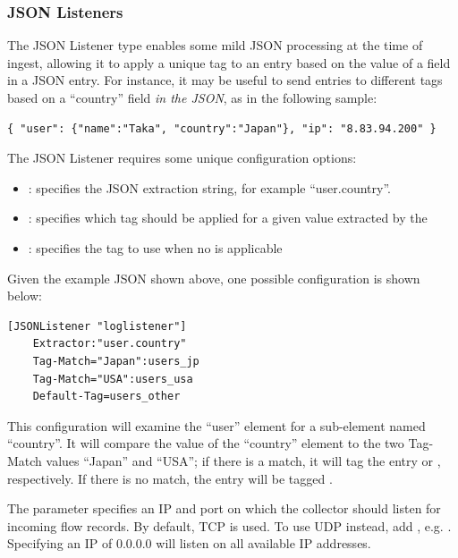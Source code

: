 \subsubsection*{JSON Listeners}

The JSON Listener type enables some mild JSON processing at the time of
ingest, allowing it to apply a unique tag to an entry based on the value
of a field in a JSON entry. For instance, it may be useful to send
entries to different tags based on a ``country'' field \emph{in the JSON},
as in the following sample:

\begin{Verbatim}[breaklines=true]
{ "user": {"name":"Taka", "country":"Japan"}, "ip": "8.83.94.200" }
\end{Verbatim}

The JSON Listener requires some unique configuration options:

\begin{itemize}
\item
  : specifies the JSON extraction string, for example
  ``user.country''.
\item
  : specifies which tag should be applied for a given value
  extracted by the 
\item
  : specifies the tag to use when no  is
  applicable
\end{itemize}

Given the example JSON shown above, one possible configuration is shown
below:

\begin{Verbatim}[breaklines=true]
[JSONListener "loglistener"]
    Extractor:"user.country"
    Tag-Match="Japan":users_jp
    Tag-Match="USA":users_usa
    Default-Tag=users_other
\end{Verbatim}

This configuration will examine the ``user'' element for a sub-element
named ``country''. It will compare the value of the ``country''
element to the two Tag-Match values ``Japan'' and ``USA''; if there is a
match, it will tag the entry  or ,
respectively. If there is no match, the entry will be tagged
.

The  parameter specifies an IP and port on which
the collector should listen for incoming flow records. By default, TCP is used.
To use UDP instead, add , e.g. .
Specifying an IP of 0.0.0.0 will listen on all available IP addresses.

